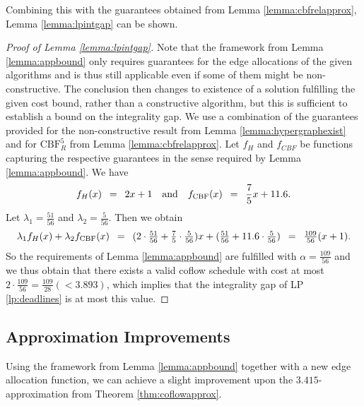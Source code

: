 \documentclass[11pt]{article}
\newcommand{\Hquad}{\hspace{0.5em}}
\begin{document}
\noindent Combining this with the guarantees obtained from Lemma \ref{lemma:cbfrelapprox}, Lemma \ref{lemma:lpintgap} can be shown.
\begin{proof}[Proof of Lemma \ref{lemma:lpintgap}]
Note that the framework from Lemma \ref{lemma:appbound} only requires guarantees for the edge allocations of the given algorithms and is thus still applicable even if some of them might be non-constructive. The conclusion then changes to existence of a solution fulfilling the given cost bound, rather than a constructive algorithm, but this is sufficient to establish a bound on the integrality gap. We use a combination of the guarantees provided for the non-constructive result from Lemma \ref{lemma:hypergraphexist} and for $\mathrm{CBF}_R^5$ from Lemma \ref{lemma:cbfrelapprox}. Let $f_H$ and $f_{CBF}$ be functions capturing the respective guarantees in the sense required by Lemma \ref{lemma:appbound}. We have 
\begin{equation*}
    f_H(x) \Hquad = \Hquad 2x + 1 \quad \text{and} \quad f_{\mathrm{CBF}}(x) \Hquad = \Hquad \frac{7}{5}x + 11.6.
\end{equation*}
Let $\lambda_1 = \frac{51}{56}$ and $\lambda_2 = \frac{5}{56}$. Then we obtain
\begin{equation*}
\lambda_1 f_H(x) + \lambda_2f_{\mathrm{CBF}}(x) \Hquad=\Hquad (2 \cdot \tfrac{51}{56} + \tfrac{7}{5}\cdot \tfrac{5}{56})x + (\tfrac{51}{56} + 11.6 \cdot \tfrac{5}{56}) \Hquad=\Hquad \tfrac{109}{56}(x+1).
\end{equation*}
So the requirements of Lemma \ref{lemma:appbound} are fulfilled with $\alpha = \frac{109}{56}$ and we thus obtain that there exists a valid coflow schedule with cost at most $2 \cdot \frac{109}{56} = \frac{109}{28} (< 3.893)$, which implies that the integrality gap of LP \ref{lp:deadlines} is at most this value.
\end{proof}

\subsection{Approximation Improvements}\label{sec:app:approximprov}

Using the framework from Lemma \ref{lemma:appbound} together with a new edge allocation function, we can achieve a slight improvement upon the $3.415$-approximation from Theorem \ref{thm:coflowapprox}.\\
\end{document}
